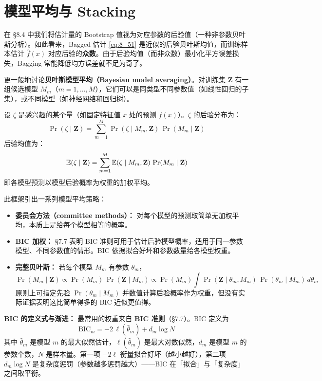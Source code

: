 \section{模型平均与 Stacking}

在 §8.4 中我们将估计量的 Bootstrap 值视为对应参数的后验值（一种非参数贝叶斯分析）。如此看来，Bagged 估计 \eqref{eq:8_51} 是近似的后验贝叶斯均值，而训练样本估计 $\hat{f}(x)$ 对应后验的\textbf{众数}。由于后验均值（而非众数）最小化平方误差损失，Bagging 常能降低均方误差就不足为奇了。

更一般地讨论\textbf{贝叶斯模型平均（Bayesian model averaging）}。对训练集 $\mathbf{Z}$ 有一组候选模型 $M_m$（$m = 1, \ldots, M$），它们可以是同类型不同参数值（如线性回归的子集），或不同模型（如神经网络和回归树）。

设 $\zeta$ 是感兴趣的某个量（如固定特征值 $x$ 处的预测 $f(x)$）。$\zeta$ 的后验分布为：
\begin{equation}\label{eq:8_53}
    \Pr(\zeta \mid \mathbf{Z}) = \sum_{m=1}^{M} \Pr(\zeta \mid M_m, \mathbf{Z})\,\Pr(M_m \mid \mathbf{Z})
\end{equation}
后验均值为：
\begin{equation}\label{eq:8_54}
    \mathbb{E}(\zeta \mid \mathbf{Z}) = \sum_{m=1}^{M} \mathbb{E}(\zeta \mid M_m, \mathbf{Z})\,\Pr(M_m \mid \mathbf{Z})
\end{equation}
即各模型预测以模型后验概率为权重的加权平均。

此框架引出一系列模型平均策略：
\begin{itemize}
    \item \textbf{委员会方法（committee methods）：} 对每个模型的预测取简单无加权平均，本质上是给每个模型相等的概率。
    \item \textbf{BIC 加权：} §7.7 表明 BIC 准则可用于估计后验模型概率，适用于同一参数模型、不同参数值的情形。BIC 依据拟合好坏和参数数量给各模型权重。
    \item \textbf{完整贝叶斯：} 若每个模型 $M_m$ 有参数 $\theta_m$，
    \begin{equation}\label{eq:8_55}
        \Pr(M_m \mid \mathbf{Z}) \propto \Pr(M_m)\,\Pr(\mathbf{Z} \mid M_m) \propto \Pr(M_m)\int \Pr(\mathbf{Z} \mid \theta_m, M_m)\,\Pr(\theta_m \mid M_m)\,d\theta_m
    \end{equation}
    原则上可指定先验 $\Pr(\theta_m \mid M_m)$ 并数值计算后验概率作为权重，但没有实际证据表明这比简单得多的 BIC 近似更值得。
\end{itemize}

\textbf{BIC 的定义式与渐进：} 最常用的权重来自 \textbf{BIC 准则}（§7.7）。BIC 定义为
\begin{equation}\label{eq:BIC_bma}
    \mathrm{BIC}_m = -2\,\ell(\hat{\theta}_m) + d_m\log N
\end{equation}
其中 $\hat{\theta}_m$ 是模型 $m$ 的最大似然估计，$\ell(\hat{\theta}_m)$ 是最大对数似然，$d_m$ 是模型 $m$ 的参数个数，$N$ 是样本量。第一项 $-2\ell$ 衡量拟合好坏（越小越好），第二项 $d_m\log N$ 是复杂度惩罚（参数越多惩罚越大）——BIC 在「拟合」与「复杂度」之间取平衡。

